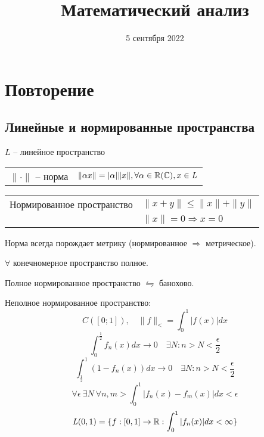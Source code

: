 


    
    \title{Математический анализ}
    \date{5 сентября 2022}
    \maketitle{}

    \pagebreak
    \section*{Повторение}
    \subsection*{Линейные и нормированные пространства}
    
    $\mathit{L}$ -- линейное пространство
    \newline
    \par
    \begin{tabularx}{\textwidth}{X l}
        $\| \cdot \|$ -- норма & $\| \alpha x \| = |\alpha| \| x \|, \forall \alpha \in \mathbb{R} (\mathbb{C}), x \in \mathit L$
    \end{tabularx}
    \newline
    \par
    \begin{tabularx}{\textwidth}{X l}
        Нормированное пространство & $\| x + y \| \le \| x \| + \| y \|$ \\
        & $\| x \| = 0 \Rightarrow x = 0$ \\
    \end{tabularx}

    \begin{remark}
        Норма всегда порождает метрику (нормированное $\Rightarrow$ метрическое).
    \end{remark}

    \begin{remark}
        $\forall$ конечномерное пространство полное.
    \end{remark}

    \begin{definition}
        Полное нормированное пространство $\leftrightharpoons$ банохово.
    \end{definition}

    \begin{illustration}
        Неполное нормированное пространство:
        \[
            C([0; 1]), \quad \| f \|_< = \int_0^1 |f(x)| dx
        \]
        \[
            \int_0^\frac12 f_n(x) dx \rightarrow 0 \quad \exists N: n > N < \frac \epsilon 2
        \]
        \[
            \int_\frac12^1 (1 - f_n(x)) dx \rightarrow 0 \quad \exists N: n > N < \frac \epsilon 2
        \]
        \[
            \forall \epsilon \ \exists N \ \forall n, m > \int_0^1 |f_n(x) - f_m(x)| dx < \epsilon   
        \]
        \[
            \mathit{L}(0, 1) = \{ f : [0, 1] \rightarrow \mathbb{R} : \int_0^1 |f_n(x)| dx < \infty \}    
        \]
    \end{illustration}

